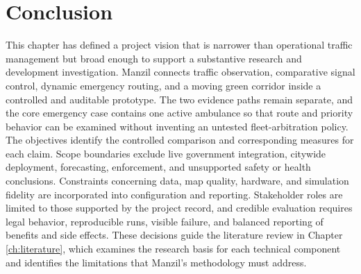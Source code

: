 \section{Conclusion}

This chapter has defined a project vision that is narrower than operational traffic management but broad enough to support a substantive research and development investigation. Manzil connects traffic observation, comparative signal control, dynamic emergency routing, and a moving green corridor inside a controlled and auditable prototype. The two evidence paths remain separate, and the core emergency case contains one active ambulance so that route and priority behavior can be examined without inventing an untested fleet-arbitration policy. The objectives identify the controlled comparison and corresponding measures for each claim. Scope boundaries exclude live government integration, citywide deployment, forecasting, enforcement, and unsupported safety or health conclusions. Constraints concerning data, map quality, hardware, and simulation fidelity are incorporated into configuration and reporting. Stakeholder roles are limited to those supported by the project record, and credible evaluation requires legal behavior, reproducible runs, visible failure, and balanced reporting of benefits and side effects. These decisions guide the literature review in Chapter \ref{ch:literature}, which examines the research basis for each technical component and identifies the limitations that Manzil's methodology must address.
